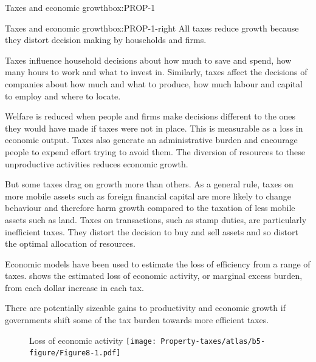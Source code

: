 \documentclass[twoside,english]{Dianab5ona4portrait}
\begin{document}
{\begin{lultrabox}{Taxes and economic growth}{box:PROP-1}
\begin{figure}[H]
\end{figure}
\end{lultrabox}
\begin{rultrabox}{Taxes and economic growth}{box:PROP-1-right}%
All taxes reduce growth because they distort decision making by households and firms.

Taxes influence household decisions about how much to save and spend, how many hours to work and what to invest in. Similarly, taxes affect the decisions of companies about how much and what to produce, how much labour and capital to employ and where to locate.

Welfare is reduced when people and firms make decisions different to the ones they would have made if taxes were not in place. This is measurable as a loss in economic output.  Taxes also generate an administrative burden and encourage people to expend effort trying to avoid them. The diversion of resources to these unproductive activities reduces economic growth. 

But some taxes drag on growth more than others. As a general rule, taxes on more mobile assets such as foreign financial capital are more likely to change behaviour and therefore harm growth compared to the taxation of less mobile assets such as land. Taxes on transactions, such as stamp duties, are particularly inefficient taxes. They distort the decision to buy and sell assets and so distort the optimal allocation of resources. 

Economic models have been used to estimate the loss of efficiency from a range of taxes.  shows the estimated loss of economic activity, or marginal excess burden, from each dollar increase in each tax.

There are potentially sizeable gains to productivity and economic growth if governments shift some of the tax burden towards more efficient taxes.

\begin{figure}[H]
%
{Loss of economic activity}
\texttt{[image: Property-taxes/atlas/b5-figure/Figure8-1.pdf]}


\end{figure}
\end{rultrabox}}
\end{document}
